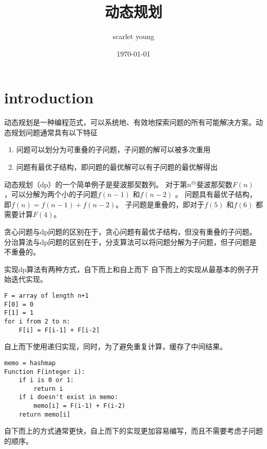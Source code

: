 \documentclass[a4paper]{article}
\title{动态规划}
\author{scarlet young}
\date{\today}
\begin{document}
\section{introduction}
动态规划是一种编程范式，可以系统地、有效地探索问题的所有可能解决方案。动态规划问题通常具有以下特征
\begin{enumerate}
	\item 问题可以划分为可重叠的子问题，子问题的解可以被多次重用
	\item 问题有最优子结构，即问题的最优解可以有子问题的最优解得出
\end{enumerate}
动态规划（dp）的一个简单例子是斐波那契数列。
对于第$n^{th}$斐波那契数$F(n)$ ，可以分解为两个小的子问题$f(n-1)$ 和$f(n-2)$ 。
问题具有最优子结构，即$f(n) = f(n-1) + f(n-2)$。
子问题是重叠的，即对于$f(5)$ 和$f(6)$ 都需要计算$F(4)$。

贪心问题与dp问题的区别在于，贪心问题有最优子结构，但没有重叠的子问题。
分治算法与dp问题的区别在于，分支算法可以将问题分解为子问题，但子问题是不重叠的。

实现dp算法有两种方式，自下而上和自上而下
自下而上的实现从最基本的例子开始迭代实现。
\begin{lstlisting}
F = array of length n+1
F[0] = 0
F[1] = 1
for i from 2 to n:
	F[i] = F[i-1] + F[i-2]
\end{lstlisting}

自上而下使用递归实现，同时，为了避免重复计算，缓存了中间结果。
\begin{lstlisting}
memo = hashmap
Function F(integer i):
	if i is 0 or 1:
		return i
	if i doesn't exist in memo:
		memo[i] = F(i-1) + F(i-2)
	return memo[i]	
\end{lstlisting}

自下而上的方式通常更快，自上而下的实现更加容易编写，而且不需要考虑子问题的顺序。
\end{document}
